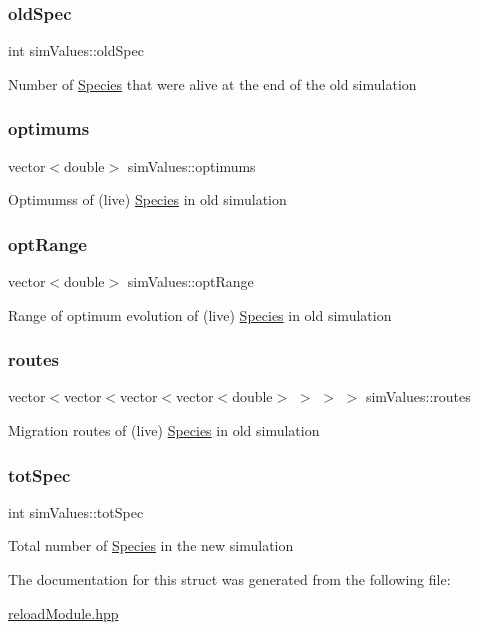 \subsubsection{\texorpdfstring{old\+Spec}{oldSpec}}
{\footnotesize\ttfamily int sim\+Values\+::old\+Spec}

Number of \hyperlink{classSpecies}{Species} that were alive at the end of the old simulation \hypertarget{structsimValues_ab00d0541616bb1d309639954b90b3e1d}{}\label{structsimValues_ab00d0541616bb1d309639954b90b3e1d} 
\subsubsection{\texorpdfstring{optimums}{optimums}}
{\footnotesize\ttfamily vector$<$double$>$ sim\+Values\+::optimums}

Optimumss of (live) \hyperlink{classSpecies}{Species} in old simulation \hypertarget{structsimValues_a8b045e15d8493873f87bbfb99cc6c10d}{}\label{structsimValues_a8b045e15d8493873f87bbfb99cc6c10d} 
\subsubsection{\texorpdfstring{opt\+Range}{optRange}}
{\footnotesize\ttfamily vector$<$double$>$ sim\+Values\+::opt\+Range}

Range of optimum evolution of (live) \hyperlink{classSpecies}{Species} in old simulation \hypertarget{structsimValues_a6745659920f5fb456202f8c84cb75a46}{}\label{structsimValues_a6745659920f5fb456202f8c84cb75a46} 
\subsubsection{\texorpdfstring{routes}{routes}}
{\footnotesize\ttfamily vector$<$vector$<$vector$<$vector$<$double$>$ $>$ $>$ $>$ sim\+Values\+::routes}

Migration routes of (live) \hyperlink{classSpecies}{Species} in old simulation \hypertarget{structsimValues_aeb4d9fe040a0ecb69669675753088a10}{}\label{structsimValues_aeb4d9fe040a0ecb69669675753088a10} 
\subsubsection{\texorpdfstring{tot\+Spec}{totSpec}}
{\footnotesize\ttfamily int sim\+Values\+::tot\+Spec}

Total number of \hyperlink{classSpecies}{Species} in the new simulation 

The documentation for this struct was generated from the following file\+:\begin{DoxyCompactItemize}
\item 
\hyperlink{reloadModule_8hpp}{reload\+Module.\+hpp}\end{DoxyCompactItemize}
